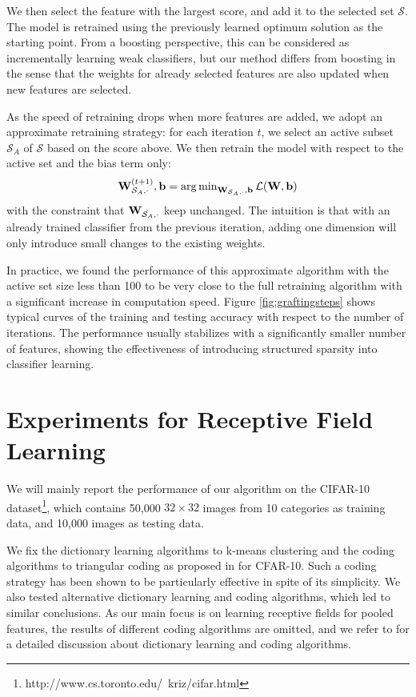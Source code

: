 We then select the feature with the largest score, and add it to the selected set $\mathcal{S}$. The model is retrained using the previously learned optimum solution as the starting point. From a boosting perspective, this can be considered as incrementally learning weak classifiers, but our method differs from boosting in the sense that the weights for already selected features are also updated when new features are selected.

As the speed of retraining drops when more features are added, we adopt an approximate retraining strategy: for each iteration $t$, we select an active subset $\mathcal{S}_{A}$ of $\mathcal{S}$ based on the score above. We then retrain the model with respect to the active set and the bias term only:
\begin{equation}
  \mathbf{W}^{(t+1)}_{\mathcal{S}_A,\cdot}, \mathbf{b} = \operatorname{\arg\min}_{\mathbf{W}_{\mathcal{S}_A,\cdot},\mathbf{b}}\mathcal{L}(\mathbf{W},\mathbf{b})
\end{equation}
with the constraint that $\mathbf{W}_{\bar{\mathcal{S}_A},\cdot}$ keep unchanged. The intuition is that with an already trained classifier from the previous iteration, adding one dimension will only introduce small changes to the existing weights. 

In practice, we found the performance of this approximate algorithm with the active set size less than 100 to be very close to the full retraining algorithm with a significant increase in computation speed. Figure \ref{fig:graftingsteps} shows typical curves of the training and testing accuracy with respect to the number of iterations. The performance usually stabilizes with a significantly smaller number of features, showing the effectiveness of introducing structured sparsity into classifier learning.

\section{Experiments for Receptive Field Learning}\label{sec:experiments}
We will mainly report the performance of our algorithm on the CIFAR-10 dataset\footnote{http://www.cs.toronto.edu/~kriz/cifar.html}, which contains 50,000 $32\times32$ images from 10 categories as training data, and 10,000 images as testing data.

We fix the dictionary learning algorithms to k-means clustering and the coding algorithms to triangular coding as proposed in \cite{Coates:wo} for CFAR-10. Such a coding strategy has been shown to be particularly effective in spite of its simplicity. We also tested alternative dictionary learning and coding algorithms, which led to similar conclusions. As our main focus is on learning receptive fields for pooled features, the results of different coding algorithms are omitted, and we refer to \cite{Coates:2011ud} for a detailed discussion about dictionary learning and coding algorithms. 

